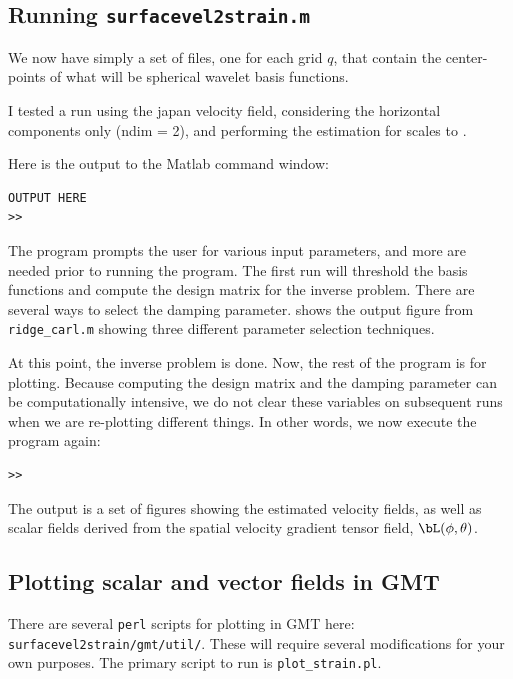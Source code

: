 \documentclass[11pt,titlepage,fleqn]{article}
\begin{document}
\subsection{Running {\tt surfacevel2strain.m}}

We now have simply a set of files, one for each grid $q$, that contain the center-points of what will be spherical wavelet basis functions.

I tested a run using the japan velocity field, considering the horizontal components only (ndim = 2), and performing the estimation for scales  to .

Here is the output to the Matlab command window:
%
\begin{spacing}{1.0}
\begin{verbatim}
OUTPUT HERE
>>
\end{verbatim}
\end{spacing}
%
The program prompts the user for various input parameters, and more are needed prior to running the program.  The first run will threshold the basis functions and compute the design matrix for the inverse problem.  There are several ways to select the damping parameter.  shows the output figure from \verb+ridge_carl.m+ showing three different parameter selection techniques.

At this point, the inverse problem is done.  Now, the rest of the program is for plotting.  Because computing the design matrix and the damping parameter can be computationally intensive, we do not clear these variables on subsequent runs when we are re-plotting different things.  In other words, we now execute the program again:
%
\begin{spacing}{1.0}
\begin{verbatim}
>>
\end{verbatim}
\end{spacing}
%
The output is a set of figures showing the estimated velocity fields, as well as scalar fields derived from the spatial velocity gradient tensor field, $\bL(\phi, \theta)$.


\subsection*{Plotting scalar and vector fields in GMT}

There are several \verb+perl+ scripts for plotting in GMT here:
%
\verb+surfacevel2strain/gmt/util/+.
%
These will require several modifications for your own purposes. The primary script to run is \verb+plot_strain.pl+.
\end{document}
